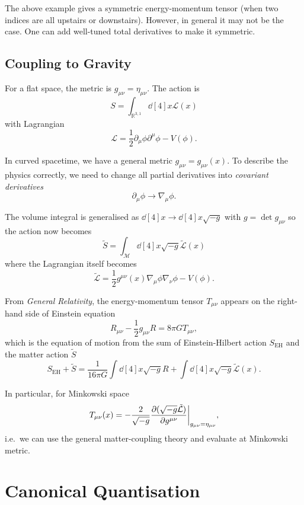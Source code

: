 \documentclass[a4paper,11pt]{article}
\begin{document}
	\begin{nt}
		The above example gives a symmetric energy-momentum tensor (when two indices are all upstairs or downstairs). However, in general it may not be the case. One can add well-tuned total derivatives to make it symmetric.
	\end{nt}

	\subsection{Coupling to Gravity}

	For a flat space, the metric is $g _{\mu \nu} = \eta _{\mu \nu}$. The action is
	\[
		S = \int _{\mathbb{R}^{3,1}} \dd[4]{x} \mathcal{L}(x)
	\]
	with Lagrangian
	\[
		\mathcal{L} = \frac{1}{2} \partial_\mu \phi \partial^\mu \phi - V(\phi).
	\]
	
	In curved spacetime, we have a general metric $g _{\mu \nu} = g _{\mu \nu}(x)$. To describe the physics correctly, we need to change all partial derivatives into \emph{covariant derivatives}
	\[
		\partial_\mu \phi \to \nabla_\mu \phi.
	\]
	
	The volume integral is generalised as $\dd[4]{x} \to \dd[4]{x} \sqrt{-g}$ with $g = \det g _{\mu \nu}$ so the action now becomes
	\[
		\tilde{S} = \int _{\mathcal{M}} \dd[4]{x} \sqrt{-g} \tilde{\mathcal{L}} (x)
	\]
	where the Lagrangian itself becomes
	\[
		\tilde{\mathcal{L}} = \frac{1}{2} g ^{\mu \nu}(x) \nabla_\mu \phi \nabla_\nu \phi - V(\phi).
	\]

	From \emph{General Relativity}, the energy-momentum tensor $T _{\mu \nu}$ appears on the right-hand side of Einstein equation
	\[
		R _{\mu \nu} - \frac{1}{2} g _{\mu \nu} R = 8 \pi G T _{\mu \nu},
	\]
	which is the equation of motion from the sum of Einstein-Hilbert action $S _{\text{EH}}$ and the matter action $\tilde{S}$
	\[
		S _{\text{EH}} + \tilde{S}= \frac{1}{16 \pi G} \int \dd[4]{x} \sqrt{-g} R + \int \dd[4]{x} \sqrt{-g} \tilde{\mathcal{L}} (x).
	\]

	In particular, for Minkowski space
	\[
		T _{\mu \nu}(x) = - \frac{2}{\sqrt{-g}} \pdv{(\sqrt{-g} \tilde{\mathcal{L}})}{g ^{\mu\nu}}\bigg|_{g_{\mu \nu} = \eta_{\mu \nu}},
	\]
	i.e.\ we can use the general matter-coupling theory and evaluate at Minkowski metric.

	\newpage

	\section{Canonical Quantisation}
\end{document}

